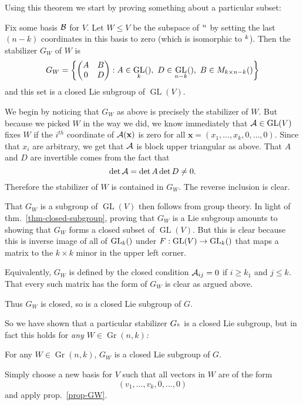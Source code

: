 \documentclass[12pt]{article}
\DeclareMathOperator{\Gr}{Gr}
\DeclareMathOperator{\GL}{GL}
\let\k\relax
\newcommand{\k}{\mathbbm{k}}
\begin{document}
\noindent Using this theorem we start by proving something about a particular subset:
\begin{prop}\label{prop-GW}
	Fix some basis $\mathcal{B}$ for $V$. Let $W\le V$ be the subspace of $\k^n$ by setting the last $(n-k)$ coordinates in this basis to zero (which is isomorphic to $\k^k$). Then 
	the stabilizer $G_W$ of $W$ is 
	\[G_W=\left\{\begin{pmatrix}
		A & B\\ 0 & D
	\end{pmatrix}:A\in\GL_k(\k),\ D\in\GL_{n-k}(\k),\ B\in M_{k\times n-k}(\k)\right\}\]
	and this set is a closed Lie subgroup of $\GL(V)$.
\end{prop}
\begin{prf}
	We begin by noticing that $G_W$ as above is precisely the stabilizer of $W$. But because we picked 
	$W$ in the way we did, we know immediately that $\calA\in\GL(V)$ fixes $W$ if the $i^{th}$ coordinate
	of $\mathcal{A}(\mathbf x)$ is zero for all $\mathbf x=(x_1,\dots,x_k,0,\dots,0)$. Since that $x_i$ are arbitrary,
	we get that $\mathcal{A}$ is block upper triangular as above. That $A$ and $D$ are invertible comes from the fact that 
	\[\det\mathcal{A}=\det A\det D\ne 0.\]
	Therefore the stabilizer of $W$ is contained in $G_W$. The reverse inclusion is clear.

	That $G_W$ is a subgroup of $\GL(V)$ then follows from group theory. In light of thm.~\ref{thm-closed-subgroup},
	proving that $G_W$ is a Lie subgroup amounts to showing that $G_W$ forms a closed subset of $\GL(V)$. But this is clear because 
	this is inverse image of all of $\GL_k(\k)$ under $F:\GL(V)\to\GL_k(\k)$ that maps a matrix to the $k\times k$ minor in the upper left corner.

	Equivalently, $G_W$ is defined by the closed condition $\mathcal{A}_{ij}=0$ if $i\ge k_1$ and $j\le k$. That every such matrix has the form of $G_W$ is 
	clear as argued above.

	Thus $G_W$ is closed, so is a closed Lie subgroup of $G$.
\end{prf}

So we have shown that a particular stabilizer $G_{\k^k}$ is a closed Lie subgroup, but in fact this holds for \textit{any $W\in\Gr(n,k)$:}
\begin{cor}
	For any $W\in\Gr(n,k)$, $G_W$ is a closed Lie subgroup of $G$.
\end{cor}
\begin{prf}
	Simply choose a new basis for $V$ such that all vectors in $W$ are of the form 
	\[(v_1,\dots,v_k,0,\dots,0)\]
	and apply prop.~\ref{prop-GW}.
\end{prf}
\end{document}
